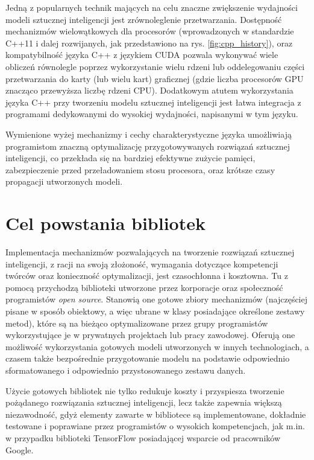 Jedną z popularnych technik mających na celu znaczne zwiększenie wydajności modeli sztucznej inteligencji jest zrównoleglenie przetwarzania. Dostępność mechanizmów wielowątkowych dla procesorów (wprowadzonych w standardzie C++11 i dalej rozwijanych, jak przedstawiono na rys. \ref{fig:cpp_history}), oraz kompatybilność języka C++ z językiem CUDA \cite{cpp_cuda} pozwala wykonywać wiele obliczeń równolegle poprzez wykorzystanie wielu rdzeni lub oddelegowaniu części przetwarzania do karty (lub wielu kart) graficznej (gdzie liczba procesorów GPU znacząco przewyższa liczbę rdzeni CPU). Dodatkowym atutem wykorzystania języka C++ przy tworzeniu modelu sztucznej inteligencji jest łatwa integracja z programami dedykowanymi do wysokiej wydajności, napisanymi w tym języku.

Wymienione wyżej mechanizmy i cechy charakterystyczne języka umożliwiają programistom znaczną optymalizację przygotowywanych rozwiązań sztucznej inteligencji, co przekłada się na bardziej efektywne zużycie pamięci, zabezpieczenie przed przeładowaniem stosu procesora, oraz krótsze czasy propagacji utworzonych modeli.

\section{Cel powstania bibliotek}

Implementacja mechanizmów pozwalających na tworzenie rozwiązań sztucznej inteligencji, z racji na swoją złożoność, wymagania dotyczące kompetencji twórców oraz konieczność optymalizacji, jest czasochłonna i kosztowna. Tu z pomocą przychodzą biblioteki utworzone przez korporacje oraz społeczność programistów \textit{open source}. Stanowią one gotowe zbiory mechanizmów (najczęściej pisane w sposób obiektowy, a więc ubrane w klasy posiadające określone zestawy metod), które są na bieżąco optymalizowane przez grupy programistów wykorzystujące je w prywatnych projektach lub pracy zawodowej. Oferują one możliwość wykorzystania gotowych modeli utworzonych w innych technologiach, a czasem także bezpośrednie przygotowanie modelu na podstawie odpowiednio sformatowanego i odpowiednio przystosowanego zestawu danych.

Użycie gotowych bibliotek nie tylko redukuje koszty i przyspiesza tworzenie pożądanego rozwiązania sztucznej inteligencji, lecz także zapewnia większą niezawodność, gdyż elementy zawarte w bibliotece są implementowane, dokładnie testowane i poprawiane przez programistów o wysokich kompetencjach, jak m.in. w przypadku biblioteki TensorFlow posiadającej wsparcie od pracowników Google.


